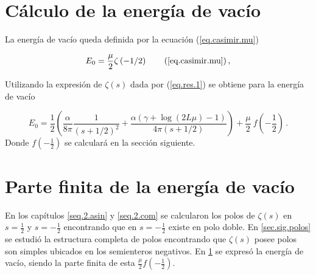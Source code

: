\begin{comment}
\begin{equation}
\frac{1 }{2 \pi i}
\int _{circulo} \lambda ^{-2s } \partial \lambda \ Ln \left[
					\frac{e ^{\frac{i \alpha  \log ( 2 \lambda L )}{2 \lambda}} e ^{2 i \lambda L} S1}
					{\Gamma \left( 1 - \frac{i \alpha}{2 \lambda} \right)} - 
					\frac{e ^{\frac{-i \alpha  \log (2 \lambda L )}{2 \lambda}} S2}
					{\Gamma \left( 1 + \frac{i \alpha}{2 \lambda} \right)}					
					\right] d \lambda
\end{equation}
\end{comment}


\section{Cálculo de la energía de vacío}
\label{sec.regular}

La energía de vacío queda definida por la ecuación (\ref{eq.casimir.mu})

\begin{equation}
    E _0 = \frac{\mu }{2}  
    \zeta  \left( - 1/2 \right) 
    \tag{\ref{eq.casimir.mu}} \, ,
\end{equation}

Utilizando la expresión de $\zeta  (s )$ dada por (\ref{eq.res.1}) se obtiene para la energía de vacío

\begin{equation}\label{eq.casimir.resultado}
E _0 = \frac{1}{2} \left(
				\frac{\alpha}{8 \pi  } \frac{1}{(s+1/2)^2} + 
				\frac{\alpha ( \gamma  +  \log (2L \mu ) -1 )}{4 \pi  (s+1/2)}
				\right) + 
				\frac{\mu}{2} \ f \left( - \frac{1}{2} \right)
\, .
\end{equation}
Donde $f \left( - \frac{1}{2}\right)$ se calculará en la sección siguiente.


\section{Parte finita de la energía de vacío}

En los capítulos \ref{seq.2.asin} y \ref{seq.2.com} se calcularon los polos de \mbox{$\zeta (s)$} en $s= \frac{1}{2}$ y $s=-\frac{1}{2}$ encontrando que en $s=- \frac{1}{2}$ existe en polo doble. En \ref{sec.sig.polos} se estudió la estructura completa de polos encontrando que $\zeta (s)$ posee polos son simples ubicados en los semienteros negativos. En \ref{sec.regular} se expresó la energía de vacío, siendo la parte finita de esta $\frac{\mu}{2} f \left( - \frac{1}{2} \right)$. 


